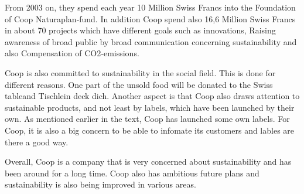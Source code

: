 From 2003 on, they spend each year 10 Million Swiss Francs into the Foundation of Coop Naturaplan‐fund. In addition Coop spend also 16,6 Million Swiss Francs in about 70 projects which have different goals such as innovations, Raising awareness of broad public by broad communication concerning sustainability and also Compensation of CO2‐emissions.

Coop is also committed to sustainability in the social field. This is done for different reasons. One part of the unsold food will be donated to the {}\grqq Swiss table{}\grqq and {}\grqq Tischlein deck dich{}\grqq . Another aspect is that Coop also draws attention to sustainable products, and not least by labels, which have been launched by their own. As mentioned earlier in the text, Coop has launched some own labels.  For Coop, it is also a big concern to be able to infomate its customers and lables are there a good way.

Overall, Coop is a company that is very concerned about sustainability and has been around for a long time. Coop also has ambitious future plans and sustainability is also being improved in various areas.
